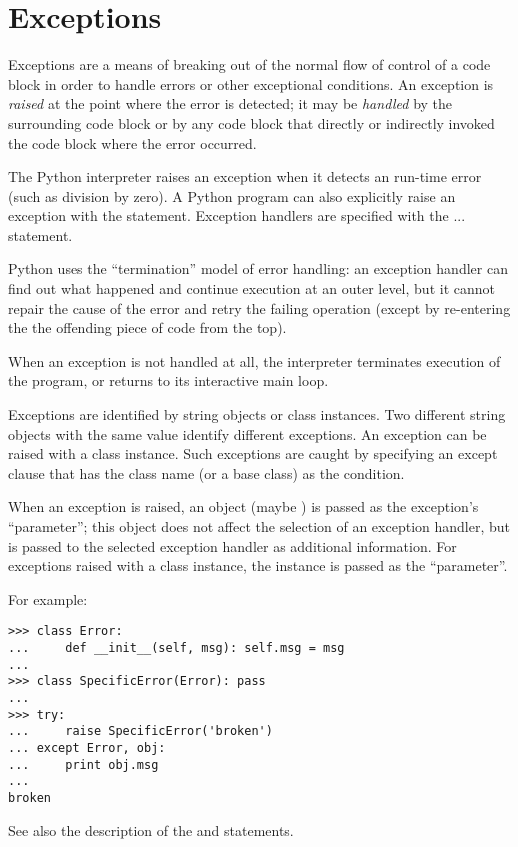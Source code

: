 \section{Exceptions}

Exceptions are a means of breaking out of the normal flow of control
of a code block in order to handle errors or other exceptional
conditions.  An exception is {\em raised} at the point where the error
is detected; it may be {\em handled} by the surrounding code block or
by any code block that directly or indirectly invoked the code block
where the error occurred.

The Python interpreter raises an exception when it detects an run-time
error (such as division by zero).  A Python program can also
explicitly raise an exception with the  statement.
Exception handlers are specified with the  ... 
statement.

Python uses the ``termination'' model of error handling: an exception
handler can find out what happened and continue execution at an outer
level, but it cannot repair the cause of the error and retry the
failing operation (except by re-entering the the offending piece of
code from the top).

When an exception is not handled at all, the interpreter terminates
execution of the program, or returns to its interactive main loop.

Exceptions are identified by string objects or class instances.  Two
different string objects with the same value identify different
exceptions.  An exception can be raised with a class instance.  Such
exceptions are caught by specifying an except clause that has the
class name (or a base class) as the condition.

When an exception is raised, an object (maybe ) is passed
as the exception's ``parameter''; this object does not affect the
selection of an exception handler, but is passed to the selected
exception handler as additional information.  For exceptions raised
with a class instance, the instance is passed as the ``parameter''.

For example:

\begin{verbatim}
>>> class Error:
...     def __init__(self, msg): self.msg = msg
... 
>>> class SpecificError(Error): pass
... 
>>> try:
...     raise SpecificError('broken')
... except Error, obj:
...     print obj.msg
... 
broken
\end{verbatim}

See also the description of the  and 
statements.
